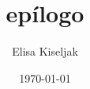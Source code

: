 \documentclass[a5paper,doc,12pt,apacite]{apa6}
\title{epílogo}
\author{Elisa Kiseljak}
\affiliation{Tres historias europeas}
\date{\today}
\begin{document}
\maketitle


\shorttitle{}



\nocite{Bosch}
 
\end{document}
